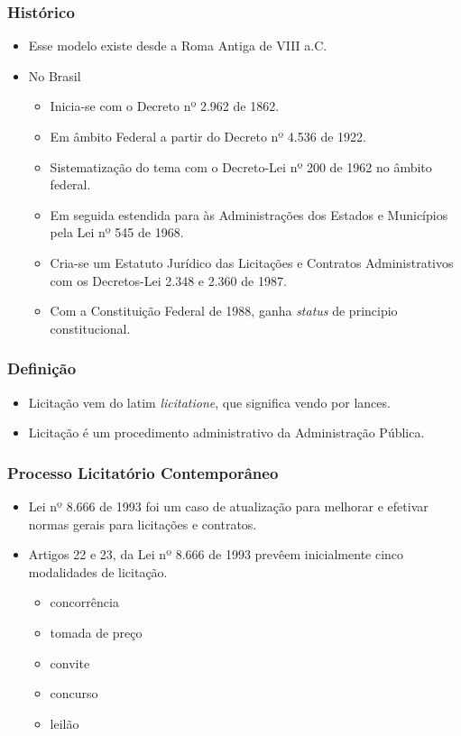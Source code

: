 \documentclass{beamer}
\begin{document}
		\begin{frame}\frametitle{Histórico}
			\begin{itemize}
				\item Esse modelo existe desde a Roma Antiga de VIII a.C.
				\item No Brasil
				\begin{itemize}
					\item Inicia-se com o Decreto nº 2.962 de 1862.
					\item Em âmbito Federal a partir do Decreto nº 4.536 de 1922.
					\item Sistematização do tema com o Decreto-Lei nº 200 de 1962 no âmbito federal.
					\item Em seguida estendida para às Administrações dos Estados e Municípios pela Lei nº 545 de 1968.
					\item Cria-se um Estatuto Jurídico das Licitações e Contratos Administrativos com os Decretos-Lei 2.348 e 2.360 de 1987.
					\item Com a Constituição Federal de 1988, ganha \textit{status} de principio constitucional.
				\end{itemize}	
			\end{itemize}
		\end{frame}
	
		\begin{frame} \frametitle{Definição}
			\begin{itemize}
				\item Licitação vem do latim \textit{licitatione}, que significa vendo por lances.
				\item Licitação é um procedimento administrativo da Administração Pública.
			\end{itemize}
		\end{frame}	
	
		\begin{frame} \frametitle{Processo Licitatório Contemporâneo}
			\begin{itemize}
				\item Lei nº 8.666 de 1993 foi um caso de atualização para melhorar e efetivar normas gerais para licitações e contratos.
				\item Artigos 22 e 23, da Lei nº 8.666 de 1993 prevêem inicialmente cinco modalidades de licitação.
					\begin{itemize}
						\item concorrência
						\item tomada de preço
						\item convite
						\item concurso
						\item leilão
					\end{itemize}
			\end{itemize}
		\end{frame}		
	
\end{document}
